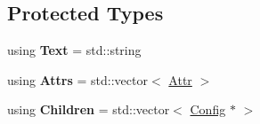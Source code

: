 \subsection*{Protected Types}
\begin{DoxyCompactItemize}
\item 
\mbox{\label{classtheoria_1_1config_1_1Config_ac1325f2d355e7c617dcd16d561ee2429}} 
using {\bfseries Text} = std\+::string
\item 
\mbox{\label{classtheoria_1_1config_1_1Config_a3590578a57d530fe1e51d25b0e492f7d}} 
using {\bfseries Attrs} = std\+::vector$<$ \hyperlink{structtheoria_1_1config_1_1Config_1_1Attr}{Attr} $>$
\item 
\mbox{\label{classtheoria_1_1config_1_1Config_acc6cccfd7dd23be9bbd053c55a1e8eb7}} 
using {\bfseries Children} = std\+::vector$<$ \hyperlink{classtheoria_1_1config_1_1Config}{Config} $\ast$ $>$
\end{DoxyCompactItemize}
